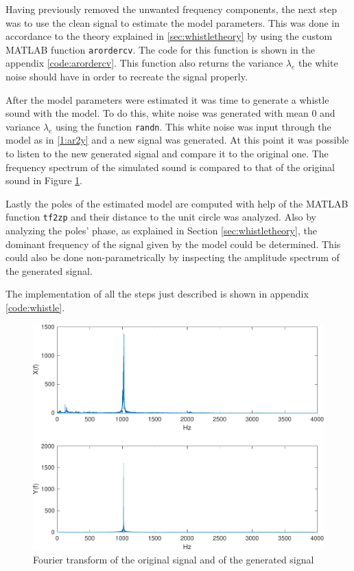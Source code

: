 \documentclass{IEEEtran}
\newcommand{\code}[1]{\texttt{#1}}
\begin{document}
Having previously removed the unwanted frequency components, the next
step was to use the clean signal to estimate the model parameters.
This was done in accordance to the theory explained in \ref{sec:whistletheory}
by using the custom MATLAB function \code{arordercv}. The code for this
function is shown in the appendix \ref{code:arordercv}. This function also
returns the variance $\lambda_e$ the white noise should have in order to
recreate the signal properly.

After the model parameters were estimated it was time to generate a whistle
sound with the model. To do this, white noise was generated with mean $0$
and variance $\lambda_e$ using the function \code{randn}. This white noise
was input through the model as in \eqref{1:ar2y} and a new signal
was generated. At this point it was possible to listen to the new generated
signal and compare it to the original one. The frequency spectrum of the
simulated sound is compared to that of the original sound in Figure
\ref{1:whistle_gen_freq}.

Lastly the poles of the estimated model are computed with help of the
MATLAB function \code{tf2zp} and their distance to the unit circle was
analyzed. Also by analyzing the poles' phase, as explained in Section
\ref{sec:whistletheory}, the dominant frequency of the signal given by
the model could be determined. This could also be done non-parametrically
by inspecting the amplitude spectrum of the generated signal.

The implementation of all the steps just described is shown in appendix
\ref{code:whistle}.

\begin{figure}[h]
  \centering
  \captionsetup{justification=centering}

  \includegraphics[width=0.8\columnwidth]{pictures/whistle_gen_freq.pdf}
  \caption{Fourier transform of the original signal and of the generated signal}
  \label{1:whistle_gen_freq}

\end{figure}
\end{document}
